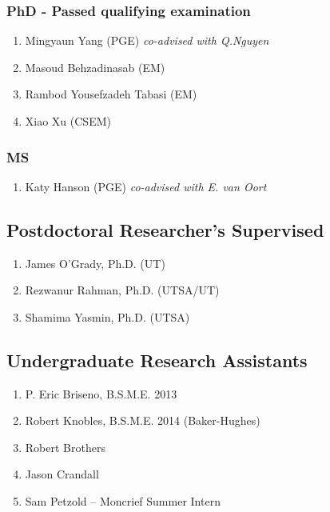 \subsubsection*{PhD - Passed qualifying examination}
\begin{enumerate}
    \item Mingyaun Yang (PGE) \emph{co-advised with Q.Nguyen}
    \item Masoud Behzadinasab (EM)
    \item Rambod Yousefzadeh Tabasi (EM)
    \item Xiao Xu (CSEM)
\end{enumerate}


\subsubsection*{MS}
\begin{enumerate}
    \item Katy Hanson (PGE) \emph{co-advised with E. van Oort}
\end{enumerate}

\subsection*{Postdoctoral Researcher's Supervised}
  \begin{enumerate}
      \item James O'Grady, Ph.D. (UT)
      \item Rezwanur Rahman, Ph.D. (UTSA/UT)
      \item Shamima Yasmin, Ph.D. (UTSA)
  \end{enumerate}

\subsection*{Undergraduate Research Assistants}
  \begin{enumerate}
    \item P. Eric Briseno, B.S.M.E. 2013
    \item Robert Knobles, B.S.M.E. 2014 (Baker-Hughes)
    \item Robert Brothers
    \item Jason Crandall
    \item Sam Petzold -- Moncrief Summer Intern
  \end{enumerate}

